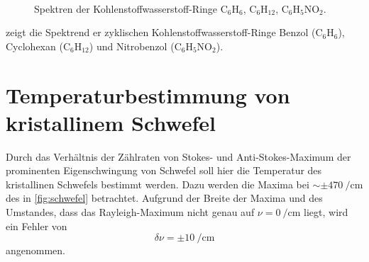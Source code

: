 \documentclass[../bericht.tex]{subfiles}
\begin{document}
\begin{figure}[tb]
{
          \label{fig:c6h12}
        } \\
        \caption[Spektren der Kohlenstoffwasserstoff-Ringe und exemplarische Struktur eines Benzolrings.]{Spektren der Kohlenstoffwasserstoff-Ringe \protect{} $\mathrm{C_6H_6}$, \protect{} $\mathrm{C_6H_{12}}$, \protect{} $\mathrm{C_6H_5NO_2}$. }
        \label{fig:ringe}
      \end{figure}

       zeigt die Spektrend er zyklischen Kohlenstoffwasserstoff-Ringe Benzol ($\mathrm{C_6H_6}$), Cyclohexan ($\mathrm{C_6H_{12}}$) und Nitrobenzol ($\mathrm{C_6H_5NO_2}$).


  \section{Temperaturbestimmung von kristallinem Schwefel}

    Durch das Verhältnis der Zählraten von Stokes- und Anti-Stokes-Maximum der prominenten Eigenschwingung von Schwefel soll hier die Temperatur des kristallinen Schwefels bestimmt werden. Dazu werden die Maxima bei $\sim\pm\SI{470}{\per\centi\meter}$ des in \cref{fig:schwefel} betrachtet. Aufgrund der Breite der Maxima und des Umstandes, dass das Rayleigh-Maximum nicht genau auf $\nu=\SI{0}{\per\centi\meter}$ liegt, wird ein Fehler von
    \begin{equation*}
      \delta \nu = \pm\SI{10}{\per\centi\meter}
    \end{equation*}
    angenommen.
\end{document}
